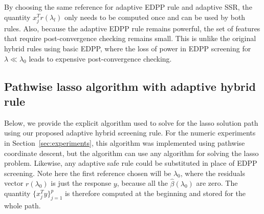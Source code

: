 By choosing the same reference for adaptive EDPP rule and adaptive SSR, the quantity $x_j^Tr(\lambda_l)$ only needs to be computed once and can be used by both rules. Also, because the adaptive EDPP rule remains powerful, the set of features that require post-convergence checking remains small.  This is unlike the original hybrid rules using basic EDPP, where the loss of power in EDPP screening for $\lambda \ll \lambda_0$ leads to expensive post-convergence checking.

\subsection{Pathwise lasso algorithm with adaptive hybrid rule}

Below, we provide the explicit algorithm used to solve for the lasso solution path using our proposed adaptive hybrid screening rule. For the numeric experiments in Section~\ref{sec:experiments}, this algorithm was implemented using pathwise coordinate descent, but the algorithm can use any algorithm for solving the lasso problem.  Likewise, any adaptive safe rule could be substituted in place of EDPP screening.  Note here the first reference chosen will be $\lambda_0$, where the residuals vector $r(\lambda_0)$ is just the response $y$, because all the $\hat{\beta}(\lambda_0)$ are zero. The quantity $\{x_j^Ty\}_{j=1}^p$ is therefore computed at the beginning and stored for the whole path.

